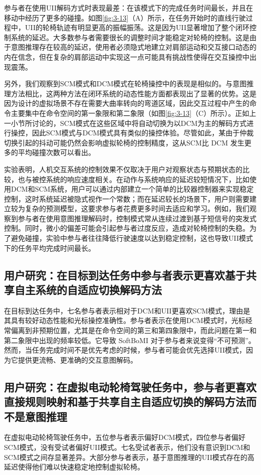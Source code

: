 参与者在使用UII解码方式时表现最差：在该模式下的完成任务时间最长，并且在移动中经历了更多的碰撞。如图\ref{fig:3-13}（A）所示，在任务开始时的直线行驶过程中，UII的轮椅轨迹有明显更高的振幅振荡。这是因为UII显著增加了整个闭环控制系统的延迟。大多数参与者需要很长的调整时间才能稳定对轮椅的控制。这是由于意图推理存在较高的延迟，使用者必须隐式地建立对肩部运动和交互接口动态的内在信念，但在复杂的肩部运动中实现这一点可能具有挑战性使得在交互操控中出现震荡。  

另外，我们观察到SCM模式和DCM模式在轮椅操控中的表现是相似的。与意图推理方法相比，这两种方法在闭环系统的动态性能方面都表现出了显著的优势。这是因为设计的虚拟场景不存在需要大曲率转向的弯道区域，因此交互过程中产生的命令主要集中在命令空间的第一象限和第二象限（如图\ref{fig:3-13}（C）所示）。正如上一小节所讨论的，SCM模式在这些区域中将自动切换为以DCM为主的解码方式进行操控，因此SCM模式与DCM模式具有类似的操控体验。尽管如此，某由于仲裁切换引起的抖动可能仍然会影响虚拟轮椅的控制精度，这从SCM比 DCM 发生更多的平均碰撞次数可以看出。  

实验表明，人机交互系统的控制效果不仅取决于用户对观察状态与预期状态的比较，也与被控系统的响应速度相关。在动作与系统响应的延迟较短情况下，比如使用DCM和SCM系统，用户可以通过内部建立一个简单的比较器控制器来实现稳定控制，这时系统延迟被隐式视作一个常数；而在延迟较长的场景下，用户则需要建立较为复杂的预测模型，这要求参与者花费更多时间去适应和学习。例如，我们观察到参与者在使用意图推理解码时，控制模式常从连续过渡到基于短信号的突发式控制。同时，微小的偏差可能会引起参与者过度反应，造成对轮椅控制的失稳。为了避免碰撞，实验中参与者往往降低行驶速度以达到稳定控制，这也导致UII模式下的任务平均完成时间最长。

\subsection{用户研究：在目标到达任务中参与者表示更喜欢基于共享自主系统的自适应切换解码方法}在目标到达任务中，七名参与者表示相对于DCM和UII更喜欢SCM模式，理由是其具有较好动态性能和光标操控准确性。参与者表示在使用DCM模式时，光标经常偏离到非预期位置，尤其是在命令空间的第三和第四象限中，而此问题在第一和第二象限中出现的频率较低。它导致 SoftBoMI 对于参与者来说变得``不可预测''。然而，当任务完成时间不是优先考虑的时候，参与者可能会优先选择UII模式，因为它提供更流畅、更准确的交互意图解码。  

\subsection{用户研究：在虚拟电动轮椅驾驶任务中，参与者更喜欢直接规则映射和基于共享自主自适应切换的解码方法而不是意图推理}在虚拟电动轮椅驾驶任务中，五位参与者表示偏好DCM模式，四位参与者偏好SCM模式，没有受试者偏好UII模式。七名受试者表示，他们没有意识到DCM和SCM模式之间存显著差异。大部分参与者表示，基于意图推理的UII模式存在的高延迟使得他们难以快速稳定地控制虚拟轮椅。

